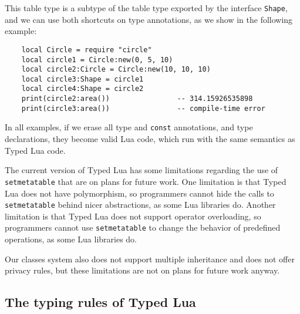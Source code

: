 This table type is a subtype of the table type exported by the interface \texttt{Shape},
and we can use both shortcuts on type annotations, as we show in the following example:
\begin{verbatim}
    local Circle = require "circle"
    local circle1 = Circle:new(0, 5, 10)
    local circle2:Circle = Circle:new(10, 10, 10)
    local circle3:Shape = circle1
    local circle4:Shape = circle2
    print(circle2:area())                -- 314.15926535898
    print(circle3:area())                -- compile-time error
\end{verbatim}

In all examples, if we erase all type and \texttt{const} annotations,
and type declarations, they become valid Lua code, which run with the
same semantics as Typed Lua code.

The current version of Typed Lua has some limitations regarding
the use of \texttt{setmetatable} that are on plans for future work.
One limitation is that Typed Lua does not have polymorphism,
so programmers cannot hide the calls to \texttt{setmetatable} behind
nicer abstractions, as some Lua libraries do.
Another limitation is that Typed Lua does not support operator overloading,
so programmers cannot use \texttt{setmetatable} to change the behavior
of predefined operations, as some Lua libraries do.

Our classes system also does not support multiple inheritance
and does not offer privacy rules, but these limitations are not
on plans for future work anyway.

\subsection{The typing rules of Typed Lua}
\label{sec:rules}

